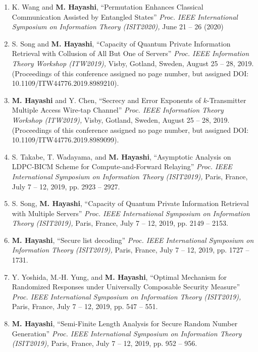 \documentclass[a4paper,12pt,oneside]{article}
\begin{document}
\begin{enumerate}
\item
K. Wang and \textbf{M. Hayashi}, 
``Permutation Enhances Classical Communication Assisted by Entangled States''
{\em Proc. IEEE International Symposium on Information Theory (ISIT2020),} 
June 21 -- 26 (2020)

\item 
S. Song and \textbf{M. Hayashi}, 
``Capacity of Quantum Private Information Retrieval with Collusion of All But One of Servers''
{\em Proc. IEEE Information Theory Workshop (ITW2019),} 
Visby, Gotland, Sweden, August 25 -- 28, 2019. 
(Proceedings of this conference assigned no page number, but assigned DOI: 10.1109/ITW44776.2019.8989210).

\item 
\textbf{M. Hayashi} and Y. Chen,
``Secrecy and Error Exponents of $k$-Transmitter Multiple Access Wire-tap Channel''
{\em Proc. IEEE Information Theory Workshop (ITW2019),} 
Visby, Gotland, Sweden, August 25 -- 28, 2019. 
(Proceedings of this conference assigned no page number, but assigned DOI: 10.1109/ITW44776.2019.8989099).

\item 
S. Takabe, T. Wadayama, and \textbf{M. Hayashi}, 
``Asymptotic Analysis on LDPC-BICM Scheme for Compute-and-Forward Relaying''
{\em Proc. IEEE International Symposium on Information Theory (ISIT2019),} 
Paris, France, July 7 -- 12, 2019, pp. 2923 -- 2927. 

\item 
S. Song, \textbf{M. Hayashi}, 
``Capacity of Quantum Private Information Retrieval with Multiple Servers''
{\em Proc. IEEE International Symposium on Information Theory (ISIT2019),} 
Paris, France, July 7 -- 12, 2019, pp. 2149 -- 2153. 

\item 
\textbf{M. Hayashi}, 
``Secure list decoding'' 
{\em Proc. IEEE International Symposium on Information Theory (ISIT2019),} 
Paris, France, July 7 -- 12, 2019, pp. 1727 -- 1731. 

\item 
Y. Yoshida, M.-H. Yung, and \textbf{M. Hayashi}, 
``Optimal Mechanism for Randomized Responses under Universally Composable Security Measure'' 
{\em Proc. IEEE International Symposium on Information Theory (ISIT2019),} 
Paris, France, July 7 -- 12, 2019, pp. 547 -- 551. 

\item 
\textbf{M. Hayashi}, 
``Semi-Finite Length Analysis for Secure Random Number Generation'' 
{\em Proc. IEEE International Symposium on Information Theory (ISIT2019),} 
Paris, France, July 7 -- 12, 2019, pp. 952 -- 956. 


\end{enumerate}
\end{document}
